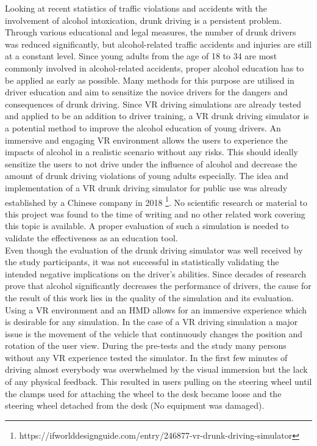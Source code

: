 Looking at recent statistics of traffic violations and accidents with the involvement of alcohol intoxication, drunk driving is a persistent problem.
Through various educational and legal measures, the number of drunk drivers was reduced significantly, but alcohol-related traffic accidents and injuries are still at a constant level.
Since young adults from the age of 18 to 34 are most commonly involved in alcohol-related accidents, proper alcohol education has to be applied as early as possible.
Many methods for this purpose are utilised in driver education and aim to sensitize the novice drivers for the dangers and consequences of drunk driving.
Since VR driving simulations are already tested and applied to be an addition to driver training, a VR drunk driving simulator is a potential method to improve the alcohol education of young drivers.
An immersive and engaging VR environment allows the users to experience the impacts of alcohol in a realistic scenario without any risks.
This should ideally sensitize the users to not drive under the influence of alcohol and decrease the amount of drunk driving violations of young adults especially.
The idea and implementation of a VR drunk driving simulator for public use was already established by a Chinese company in 2018 \footnote{https://ifworlddesignguide.com/entry/246877-vr-drunk-driving-simulator}.
No scientific research or material to this project was found to the time of writing and no other related work covering this topic is available.
A proper evaluation of such a simulation is needed to validate the effectiveness as an education tool.
\\
Even though the evaluation of the drunk driving simulator was well received by the study participants, it was not successful in statistically validating the intended negative implications on the driver’s abilities.
Since decades of research prove that alcohol significantly decreases the performance of drivers, the cause for the result of this work lies in the quality of the simulation and its evaluation.
Using a VR environment and an HMD allows for an immersive experience which is desirable for any simulation.
In the case of a VR driving simulation a major issue is the movement of the vehicle that continuously changes the position and rotation of the user view.
During the pre-tests and the study many persons without any VR experience tested the simulator.
In the first few minutes of driving almost everybody was overwhelmed by the visual immersion but the lack of any physical feedback.
This resulted in users pulling on the steering wheel until the clamps used for attaching the wheel to the desk became loose and the steering wheel detached from the desk (No equipment was damaged).
